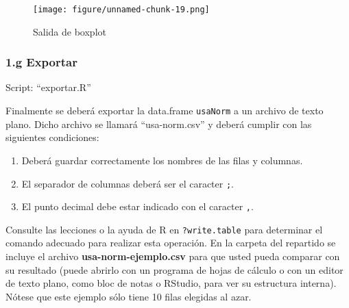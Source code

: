 \documentclass[]{article}
\makeatletter
\def\maxwidth{\ifdim\Gin@nat@width>\linewidth\linewidth
\else\Gin@nat@width\fi}
\let\Oldincludegraphics\includegraphics
\renewcommand{\includegraphics}[1]{\Oldincludegraphics[width=\maxwidth]{#1}}
\makeatother
\begin{document}
\begin{figure}[htbp]
\centering
\texttt{[image: figure/unnamed-chunk-19.png]}
\caption{Salida de boxplot}
\end{figure}

\subsubsection{1.g Exportar}

Script: ``exportar.R''

Finalmente se deberá exportar la data.frame \texttt{usaNorm} a un
archivo de texto plano. Dicho archivo se llamará ``usa-norm.csv'' y
deberá cumplir con las siguientes condiciones:

\begin{enumerate}[1.]
\item
  Deberá guardar correctamente los nombres de las filas y columnas.
\item
  El separador de columnas deberá ser el caracter \texttt{;}.
\item
  El punto decimal debe estar indicado con el caracter \texttt{,}.
\end{enumerate}

Consulte las lecciones o la ayuda de R en \texttt{?write.table} para
determinar el comando adecuado para realizar esta operación. En la
carpeta del repartido se incluye el archivo
\textbf{usa-norm-ejemplo.csv} para que usted pueda comparar con su
resultado (puede abrirlo con un programa de hojas de cálculo o con un
editor de texto plano, como bloc de notas o RStudio, para ver su
estructura interna). Nótese que este ejemplo sólo tiene 10 filas
elegidas al azar.
\end{document}
